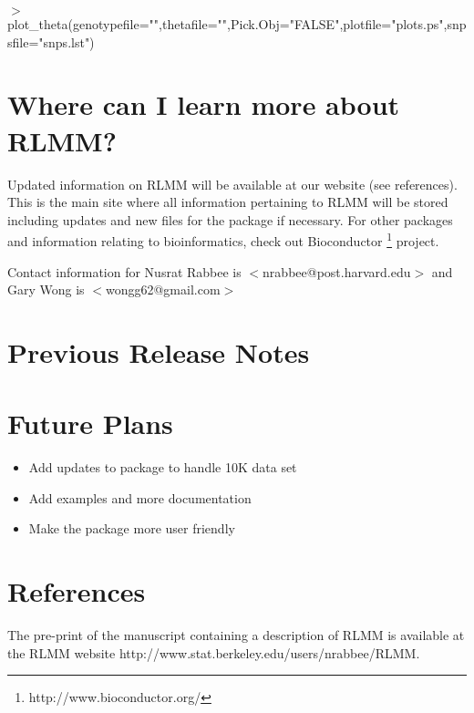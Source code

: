 \documentclass[12pt]{article}
\begin{document}
\medskip
\noindent
$>$ plot\_theta(genotypefile="",thetafile="",Pick.Obj="FALSE",plotfile="plots.ps",snpsfile="snps.lst")

\smallskip
\section{Where can I learn more about RLMM?}
\noindent
Updated information on RLMM will be available at our website (see references). This is the main site where all information 
pertaining to RLMM will be stored including updates and new files for the package if necessary. For other packages and 
information relating to bioinformatics, check out Bioconductor {\footnote {http://www.bioconductor.org/}} project. 


\medskip
\noindent
Contact information for Nusrat Rabbee is $<$nrabbee@post.harvard.edu$>$ and Gary Wong is $<$wongg62@gmail.com$>$

\appendix
\section{Previous Release Notes}

\section{Future Plans}

\begin{itemize}
\item Add updates to package to handle 10K data set
\item Add examples and more documentation
\item Make the package more user friendly
\end{itemize}

\smallskip
\noindent
\section {References}
\noindent
The pre-print of the manuscript containing a description of RLMM is available  at the RLMM website http://www.stat.berkeley.edu/users/nrabbee/RLMM. 
\end{document}
